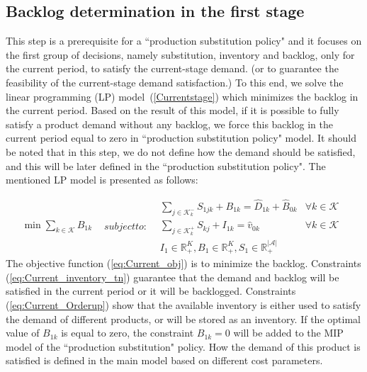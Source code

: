 \documentclass[10pt]{article}
\newcommand{\ti}{t} %
\newcommand{\ka}{k} %
\newcommand{\KA}{\mathcal{K}}
\newcommand{\Ka}{K}
\newcommand{\jey}{j} %
\newcommand{\Graf}{\mathcal{A}} %
\newcommand{\Csub}{\mathcal{K}^+_k}
\newcommand{\Psub}{\mathcal{K}^-_k}
\newcommand{\tAct}{\hat{\ti}} %
\newcommand{\cred}{\color{red!65!black}}
\begin{document}
 \subsection{Backlog determination in the first stage }
 
This step is a prerequisite for a ``production substitution policy" and it focuses on the first group of decisions, namely substitution, inventory and backlog, only for the current period, to satisfy the current-stage demand. {\cred(or to guarantee the feasibility of the current-stage demand satisfaction.)} 
To this end, we solve the linear programming (LP) model~(\ref{Currentstage}) which minimizes the backlog in the current period. Based on the result of this model, if it is possible to fully satisfy a product demand without any backlog, we force this backlog in the current period equal to zero in ``production substitution policy" model.
It should be noted that in this step, we do not define how the demand should be satisfied, and this will be later defined in the ``production substitution policy". The mentioned LP model is presented as follows:


\begin{subequations}
\label{Currentstage}

\begin{flalign}
&\min  \sum_{\ka \in \KA}  {B}_{ 1 \ka} & \label{eq:Current_obj} 
\end{flalign}
 subject to:
\begin{flalign}
  &  \sum_{\jey \in  \Psub} {S}_{1  \jey \ka} + B_{1 \ka}  = \hat{D}_{1 \ka} + \hat{B}_{0 \ka} &\forall \ka \in \KA  &     \label{eq:Current_inventory_tn}&\\
&  \sum_{\jey \in  \Csub} {S}_{ \ka \jey} + I_{ 1 \ka} = \hat{v}_{ 0 \ka} &\forall \ka \in \KA  &     \label{eq:Current_Orderup}&\\
& {I}_{ 1 } \in \mathbb{R}_{+}^{\Ka} , {B}_{ 1 } \in \mathbb{R}_{+}^{\Ka} , {S}_{1} \in \mathbb{R}_{+}^{|\Graf|} &    & \label{eq:Current_bound2}
\end{flalign}
\end{subequations}
The objective function (\ref{eq:Current_obj}) is to minimize the backlog. Constraints (\ref{eq:Current_inventory_tn}) guarantee that the demand and backlog will be satisfied in the current period or it will be backlogged. Constraints (\ref{eq:Current_Orderup}) show that the available inventory is either used to satisfy the demand of different products, or will be stored as an inventory.
If the optimal value of  $B_{ 1 \ka}$  is equal to zero, the constraint $B_{ 1 \ka} = 0$ will be added to the MIP model of the ``production substitution" policy. How the demand of this product is satisfied is defined in the main model based on different cost parameters.
\end{document}
